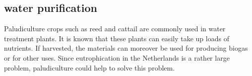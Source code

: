 \documentclass[a4paper,12pt]{scrbook}
\newcommand{\sous}[1]{\ensuremath{_{\textrm{#1}}}}
\begin{document}
\subsection{water purification}
Paludiculture crops such as reed and cattail are commonly used in water treatment plants. It is known that these plants can easily take up loads of nutrients. If harvested, the materials can moreover be used for producing biogas or for other uses. Since eutrophication in the Netherlands is a rather large problem, paludiculture could help to solve this problem.



%
%
%
%
%
%
%
%
%
%
%
%
%
\end{document}
